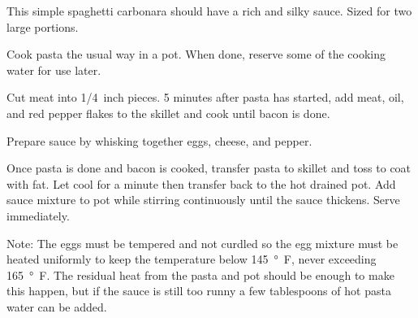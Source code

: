 
This simple spaghetti carbonara should have a rich and silky sauce. Sized for two large portions.


Cook pasta the usual way in a pot. When done, reserve some of the cooking water for use later.

\begin{ingredients}
\end{ingredients}

Cut meat into \SI{1/4}{inch} pieces. 5 minutes after pasta has started, add meat, oil, and red pepper flakes to the skillet and cook until bacon is done.

\begin{ingredients}
\end{ingredients}

Prepare sauce by whisking together eggs, cheese, and pepper.

\begin{ingredients}
\end{ingredients}

Once pasta is done and bacon is cooked, transfer pasta to skillet and toss to coat with fat. Let cool for a minute then transfer back to the hot drained pot. Add sauce mixture to pot while stirring continuously until the sauce thickens. Serve immediately.

Note: The eggs must be tempered and not curdled so the egg mixture must be heated uniformly to keep the temperature below \SI{145}{°F}, never exceeding \SI{165}{°F}. The residual heat from the pasta and pot should be enough to make this happen, but if the sauce is still too runny a few tablespoons of hot pasta water can be added.
